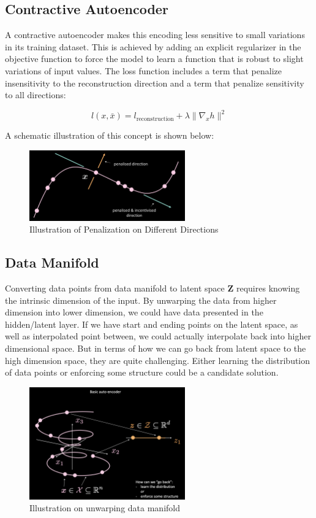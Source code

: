 \subsection{Contractive Autoencoder}

A contractive autoencoder makes this encoding less sensitive to small variations in its training dataset. This is achieved by adding an explicit regularizer in the objective function to force the model to learn a function that is robust to slight variations of input values. The loss function includes a term that penalize insensitivity to the reconstruction direction and a term that penalize sensitivity to all directions:

$$l(x,\bar{x}) = l_{\text{reconstruction}} + \lambda \| \nabla_x h \|^2$$

A schematic illustration of this concept is shown below: 

\begin{figure}[H]
    \centering
    \includegraphics[width=0.6\textwidth]{figs/Contractive_AutoEncoder.png}
    \caption{Illustration of Penalization on Different Directions}
    \label{fig:Contractive_AutoEncoder}
\end{figure}

\subsection{Data Manifold}

Converting data points from data manifold to latent space \textbf{Z} requires knowing the intrinsic dimension of the input. By unwarping the data from higher dimension into lower dimension, we could have data presented in the hidden/latent layer. If we have start and ending points on the latent space, as well as interpolated point between, we could actually interpolate back into higher dimensional space. But in terms of how we can go back from latent space to the high dimension space, they are quite challenging. Either learning the distribution of data points or enforcing some structure could be a candidate solution.

\begin{figure}[htb]
    \centering
    \includegraphics[width=0.6\textwidth]{figs/Data_manifold.png}
    \caption{Illustration on unwarping data manifold}
    \label{fig:Data_manifold}
\end{figure}